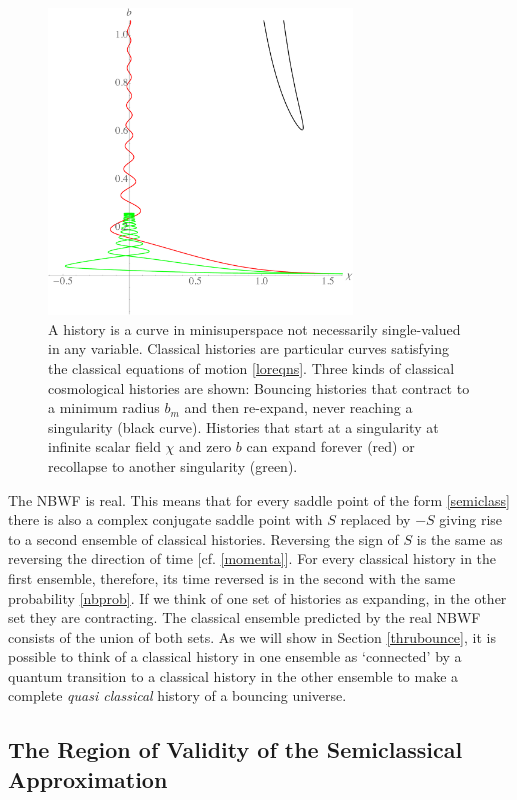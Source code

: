 \documentclass[prd,floats,superscriptaddress,eqsecnum,floatfix,nofootinbib,12pt]{revtex4}
\def\zf{}
\def\tf{}
\def\uf{}
\begin{document}
{{%
\begin{figure}[t]
\includegraphics[height=3.2in]{threehistories.pdf} 
\caption{A history is a curve in minisuperspace not necessarily single-valued in any variable. Classical histories are particular curves satisfying the classical equations of motion \eqref{loreqns}. Three kinds of classical cosmological histories are shown: Bouncing histories that contract to a minimum radius $b_m$ and then re-expand, never reaching a singularity (black curve). Histories that start at a singularity at infinite scalar field $\chi$ and zero $b$ can expand forever (red) or recollapse to another singularity (green).} 
\label{classhist}
\end{figure}


The NBWF is real. This means that for every saddle point of the form \eqref{semiclass} there is also a complex conjugate saddle point with $S$ replaced by $-S$ {\tf giving rise {\uf to a second ensemble} of classical histories.} Reversing the sign of $S$ is the same as reversing the direction of time [cf. \eqref{momenta}]. For every classical history in the first ensemble, therefore, its time reversed is in the second {\uf with the same probability \eqref{nbprob}.} If we think of one set of histories as expanding, in the other set they are contracting. {\zf The classical ensemble predicted by the real NBWF consists of the union of both sets}. As we will show in Section \ref{thrubounce}, it is possible to think of a classical history in one ensemble as `connected' by a quantum transition to a classical history in the other ensemble to make a complete {\it quasi classical} history of a bouncing universe.

\subsection{The Region of Validity of the Semiclassical Approximation}
\label{regsc}

}}
\end{document}
